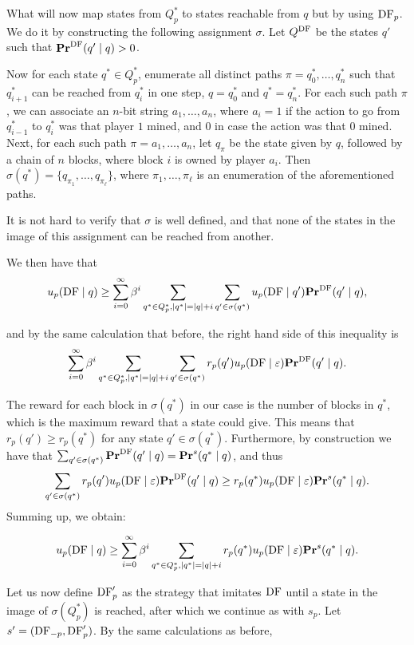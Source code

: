 What will now map states from $Q^*_p$ to states reachable from $q$ but by using $\text{\rm DF}_p$. We do it by constructing the following assignment $\sigma$.
Let $Q^{\text{\rm DF}}$ be the states $q'$ such that $\mathbf{Pr}^{\text{\rm DF}}(q' \mid q) > 0$. 

Now for each state $q^* \in Q^*_p$, enumerate all distinct paths $\pi = q^*_0,\dots,q_n^*$ such that $q_{i+1}^*$ can be reached from 
$q_i^*$ in one step, $q = q_0^*$ and $q^* = q_n^*$. For each such path $\pi$, we can associate an $n$-bit string $a_1,\dots,a_n$, 
where $a_i = 1$ if the action to go from $q_{i-1}^*$ to $q_i^*$ was that player $1$ mined, and $0$ in case the action was that $0$ mined. 
Next, for each such path $\pi = a_1,\dots,a_n$, let $q_\pi$ be the state given by $q$, followed by a chain of $n$ blocks, where block $i$ is 
owned by player $a_i$. Then $\sigma(q^*) = \{q_{\pi_1},\dots,q_{\pi_\ell}\}$, where $\pi_1,\dots,\pi_\ell$ is an enumeration of the aforementioned paths. 

It is not hard to verify that $\sigma$ is well defined, and that none of 
the states in the image of this assignment can be reached from another. 

We then have that 
$$u_p( \text{\rm DF} \mid q) \geq \sum_{i=0}^\infty \beta^i \sum_{q^* \in Q^*_p, |q^*| = |q| + i} \sum_{q' \in \sigma(q^*)} 
u_p(\text{\rm DF} \mid q')  \mathbf{Pr}^{\text{\rm DF}}(q' \mid q), $$

and by the same calculation that before, the right hand side of this inequality is 
$$\sum_{i=0}^\infty \beta^i \sum_{q^* \in Q^*_p, |q^*| = |q| + i} \sum_{q' \in \sigma(q^*)}  r_p(q') u_p(\text{\rm DF} \mid \varepsilon) \mathbf{Pr}^{\text{\rm DF}}(q' \mid q).$$

The reward for each block in $\sigma(q^*)$ in our case is the number of blocks in $q^*$, which is the maximum reward that a state could give. This means that $r_p(q') \geq r_p(q^*)$ for any state $q' \in \sigma(q^*)$. 
Furthermore,  by construction we have that 
$\sum_{q' \in \sigma(q^*)} \mathbf{Pr}^{\text{\rm DF}}(q' \mid q) = \mathbf{Pr}^s(q^* \mid q)$, and thus 
$$\sum_{q' \in \sigma(q^*)} r_p(q') u_p(\text{\rm DF} \mid \varepsilon) \mathbf{Pr}^{\text{\rm DF}}(q' \mid q) \geq r_p(q^*) u_p(\text{\rm DF} \mid \varepsilon) \mathbf{Pr}^s(q^* \mid q).$$ 
Summing up, we obtain: 

$$u_p( \text{\rm DF} \mid q) \geq \sum_{i=0}^\infty \beta^i \sum_{q^* \in Q^*_p, |q^*| = |q| + i} r_p(q^*) u_p(\text{\rm DF} \mid \varepsilon)  \mathbf{Pr}^s(q^* \mid q).$$

Let us now define $\text{\rm DF}'_p$ as the strategy that imitates $\text{\rm DF}$ until a state in the image of $\sigma(Q^*_p)$ is reached, after which 
we continue as with $s_p$. Let $s' = (\text{\rm DF}_{-p},\text{\rm DF}'_p)$. By the same calculations as before, 

